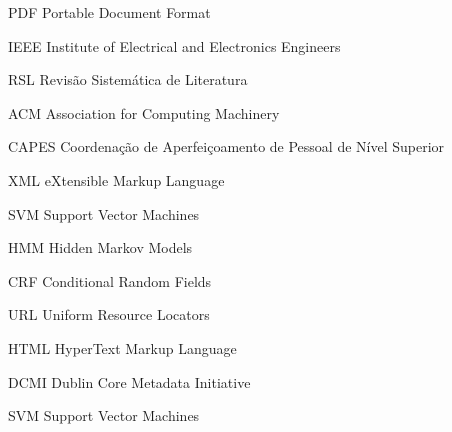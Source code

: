 \begin{siglas}
  \item[PDF] Portable Document Format
  \item[IEEE] Institute of Electrical and Electronics Engineers
  \item[RSL] Revisão Sistemática de Literatura
  \item[ACM] Association for Computing Machinery
  \item[CAPES] Coordenação de Aperfeiçoamento de Pessoal de Nível Superior
  \item[XML] eXtensible Markup Language
  \item[SVM] Support Vector Machines
  \item[HMM] Hidden Markov Models
  \item[CRF] Conditional Random Fields
  \item[URL] Uniform Resource Locators
  \item[HTML] HyperText Markup Language
  \item[DCMI] Dublin Core Metadata Initiative
  \item[SVM] Support Vector Machines
\end{siglas}